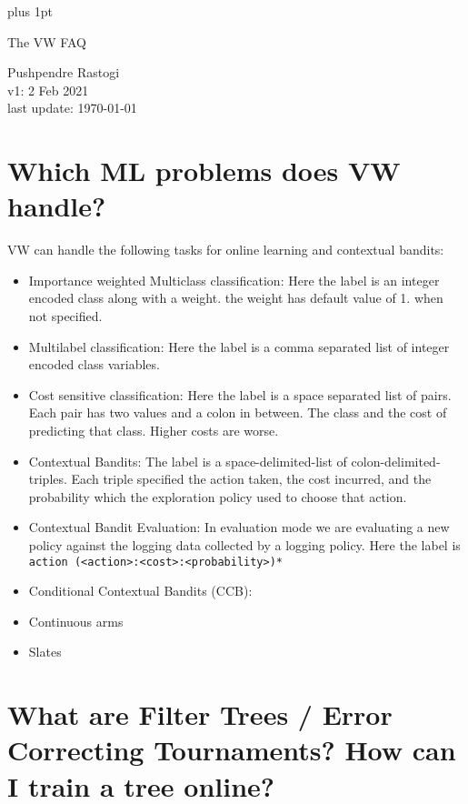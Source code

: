 \documentclass[preview,border={30 30 30 30}]{standalone}
\begin{document}
\parskip=5pt plus 1pt
\begin{center}
    \Large The VW FAQ
\end{center}
Pushpendre Rastogi\\
v1: 2 Feb 2021\\
last update: \today
\tableofcontents
\section{Which ML problems does VW handle?}
VW can handle the following  tasks for online learning and contextual bandits:
\begin{itemize}
    \item Importance weighted Multiclass classification: Here the label is an integer encoded class along with a weight. the weight has default value of 1. when not specified.
    \item Multilabel classification: Here the label is a comma separated list of integer encoded class variables.
    \item Cost sensitive classification: Here the label is a space separated list of pairs. Each pair has two values and a colon in between. The class and the cost of predicting that class. Higher costs are worse.
    \item Contextual Bandits: The label is a space-delimited-list of colon-delimited-triples. Each triple specified the action taken, the cost incurred, and the probability which the exploration policy used to choose that action.
    \item Contextual Bandit Evaluation: In evaluation mode we are evaluating a new policy against the logging data collected by a logging policy. Here the label is \texttt{action (<action>:<cost>:<probability>)*}
    \item Conditional Contextual Bandits (CCB): 
    \item Continuous arms 
    \item Slates
\end{itemize}

\section{What are Filter Trees / Error Correcting Tournaments? How can I train a tree online?}
\end{document}
